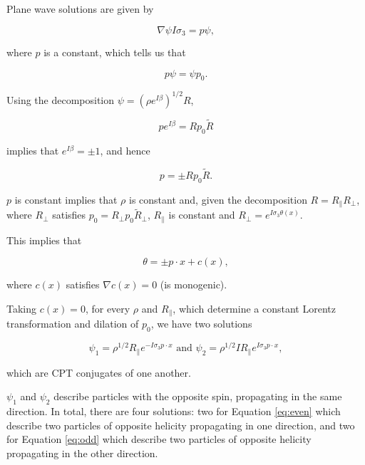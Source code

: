 \documentclass{article}
\begin{document}
  Plane wave solutions are given by

  \begin{equation}
    \nabla \psi I \sigma_3 = p \psi,\label{eq:plane}
  \end{equation}

  where $p$ is a constant, which tells us that

  \begin{equation}
    p \psi = \psi p_0.
  \end{equation}

  Using the decomposition $\psi = (\rho e^{I \beta})^{1/2} R$,

  \begin{equation}
    p e^{I \beta} = R p_0 \widetilde R
  \end{equation}

  implies that $e^{I \beta} = \pm 1$, and hence

  \begin{equation}
    p = \pm R p_0 \widetilde R.
  \end{equation}

  $p$ is constant implies that $\rho$ is constant and, given the decomposition $R = R_\parallel R_\perp$, where $R_\perp$ satisfies $p_0 = R_\perp p_0 \widetilde R_\perp$, $R_\parallel$ is constant and $R_\perp = e^{I \sigma_3 \theta(x)}$.

  This implies that 

  \begin{equation}
    \theta = \pm p \cdot x + c(x),
  \end{equation}

  where $c(x)$ satisfies $\nabla c(x) = 0$ (is monogenic).

  Taking $c(x) = 0$, for every $\rho$ and $R_\parallel$, which determine a constant Lorentz transformation and dilation of $p_0$, we have two solutions

  \begin{equation}
    \psi_1 = \rho^{1/2} R_\parallel e^{- I \sigma_3 p \cdot x} \text { and } \psi_2 = \rho^{1/2} I R_\parallel e^{I \sigma_3 p \cdot x},
  \end{equation} 

  which are CPT conjugates of one another. 

  $\psi_1$ and $\psi_2$ describe particles with the opposite spin, propagating in the same direction. In total, there are four solutions: two for Equation \ref{eq:even} which describe two particles of opposite helicity propagating in one direction, and two for Equation \ref{eq:odd} which describe two particles of opposite helicity propagating in the other direction. 
\end{document}
